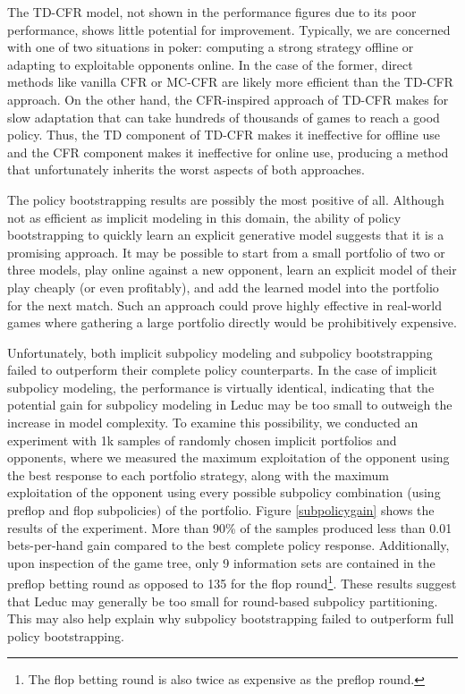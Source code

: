 \documentclass{aamas2013}
\begin{document}
The TD-CFR model, not shown in the performance figures due to its poor performance, shows little potential for improvement. Typically, we are concerned with one of two situations in poker: computing a strong strategy offline or adapting to exploitable opponents online. In the case of the former, direct methods like vanilla CFR or MC-CFR are likely more efficient than the TD-CFR approach. On the other hand, the CFR-inspired approach of TD-CFR makes for slow adaptation that can take hundreds of thousands of games to reach a good policy. Thus, the TD component of TD-CFR makes it ineffective for offline use and the CFR component makes it ineffective for online use, producing a method that unfortunately inherits the worst aspects of both approaches.

The policy bootstrapping results are possibly the most positive of all. Although not as efficient as implicit modeling in this domain, the ability of policy bootstrapping to quickly learn an explicit generative model suggests that it is a promising approach. It may be possible to start from a small portfolio of two or three models, play online against a new opponent, learn an explicit model of their play cheaply (or even profitably), and add the learned model into the portfolio for the next match. Such an approach could prove highly effective in real-world games where gathering a large portfolio directly would be prohibitively expensive.

Unfortunately, both implicit subpolicy modeling and subpolicy bootstrapping failed to outperform their complete policy counterparts. In the case of implicit subpolicy modeling, the performance is virtually identical, indicating that the potential gain for subpolicy modeling in Leduc may be too small to outweigh the increase in model complexity. To examine this possibility, we conducted an experiment with 1k samples of randomly chosen implicit portfolios and opponents, where we measured the maximum exploitation of the opponent using the best response to each portfolio strategy, along with the maximum exploitation of the opponent using every possible subpolicy combination (using preflop and flop subpolicies) of the portfolio. Figure \ref{subpolicygain} shows the results of the experiment. More than 90\% of the samples produced less than 0.01 bets-per-hand gain compared to the best complete policy response. Additionally, upon inspection of the game tree, only 9 information sets are contained in the preflop betting round as opposed to 135 for the flop round\footnote{The flop betting round is also twice as expensive as the preflop round.}. These results suggest that Leduc may generally be too small for round-based subpolicy partitioning. This may also help explain why subpolicy bootstrapping failed to outperform full policy bootstrapping.
\end{document}
